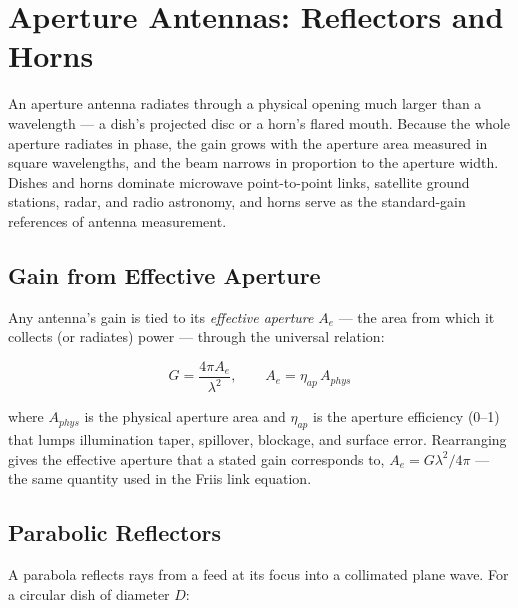 \section{Aperture Antennas: Reflectors and Horns}\label{sec:wiki_aperture_antennas}



An aperture antenna radiates through a physical opening much larger than a wavelength — a dish's projected disc or a horn's flared mouth. Because the whole aperture radiates in phase, the gain grows with the aperture area measured in square wavelengths, and the beam narrows in proportion to the aperture width. Dishes and horns dominate microwave point-to-point links, satellite ground stations, radar, and radio astronomy, and horns serve as the standard-gain references of antenna measurement.

      

\subsection{Gain from Effective Aperture}

      

Any antenna's gain is tied to its \emph{effective aperture} $A_e$ — the area from which it collects (or radiates) power — through the universal relation:

      
\[G = \dfrac{4\pi A_e}{\lambda^2},\qquad A_e = \eta_{ap}\,A_{phys}\]

      

where $A_{phys}$ is the physical aperture area and $\eta_{ap}$ is the aperture efficiency (0–1) that lumps illumination taper, spillover, blockage, and surface error. Rearranging gives the effective aperture that a stated gain corresponds to, $A_e = G\lambda^2/4\pi$ — the same quantity used in the Friis link equation.

      

\subsection{Parabolic Reflectors}

      

A parabola reflects rays from a feed at its focus into a collimated plane wave. For a circular dish of diameter $D$:


